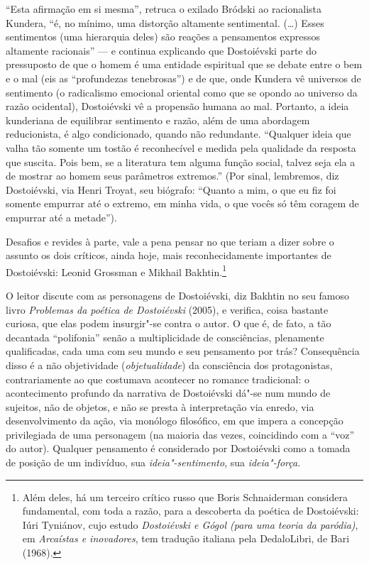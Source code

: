 ``Esta afirmação em si mesma'', retruca o exilado Bródski ao
racionalista Kundera, ``é, no mínimo, uma distorção altamente
sentimental. (\ldots{}) Esses sentimentos (uma hierarquia deles) são reações
a pensamentos expressos altamente racionais'' --- e continua explicando
que Dostoiévski parte do pressuposto de que o homem é uma entidade
espiritual que se debate entre o bem e o mal (eis as ``profundezas
tenebrosas'') e de que, onde Kundera vê universos de sentimento (o
radicalismo emocional oriental como que se opondo ao universo da razão
ocidental), Dostoiévski vê a propensão humana ao mal. Portanto, a ideia
kunderiana de equilibrar sentimento e razão, além de uma abordagem
reducionista, é algo condi­cionado, quando não redundante. ``Qualquer
ideia que valha tão somente um tostão é reconhecível e medida pela
qualidade da resposta que suscita. Pois bem, se a literatura tem alguma
função social, talvez seja ela a de mostrar ao homem seus parâmetros
extremos.'' (Por sinal, lembremos, diz Dostoiévski, via Henri Troyat, seu biógrafo:
``Quanto a mim, o que eu fiz foi somente empurrar até o extremo, em
minha vida, o que vocês só têm coragem de empurrar até a metade'').


Desafios e revides à parte, vale a pena pensar no que teriam a dizer
sobre o assunto os dois críticos, ainda hoje, mais reconhecidamente
importantes de Dostoiévski: Leonid Grossman e Mikhail Bakhtin.\footnote{Além
deles, há um terceiro crítico russo que Boris Schnaiderman considera
fundamental, com toda a razão, para a descoberta da poética de
Dostoiévski: Iúri Tyniánov, cujo estudo \emph{Dostoiévski e Gógol
(para uma teoria da paródia)}, em \emph{Arcaístas e inovadores},
tem tradução italiana pela DedaloLibri, de Bari (1968).}

O leitor discute com as personagens de Dostoiévski, diz Bakhtin no seu
famoso livro \emph{Problemas da poética de Dostoiévski} (2005), e
verifica, coisa bastante curiosa, que elas podem insurgir"-se contra o
autor. O que é, de fato, a tão decantada ``polifonia'' senão a
multiplicidade de consciências, plena­mente qualificadas, cada uma com
seu mundo e seu pensamento por trás? Consequência disso é a não
objetividade (\emph{objetualidade}) da consciência dos protagonistas,
contrariamente ao que costumava acontecer no romance tradicional: o
acontecimento profundo da narrativa de Dostoiévski dá"-se num mundo de
sujeitos, não de objetos, e não se presta à interpre­tação via enredo,
via desenvolvimento da ação, via monólogo filosófico, em que impera a
concepção privilegiada de uma personagem (na maioria das vezes,
coincidindo com a ``voz'' do autor). Qualquer pensamento é considerado
por Dostoiévski como a tomada de posição de um indivíduo, sua
\emph{ideia"-sentimento}, sua \emph{ideia"-força}.

